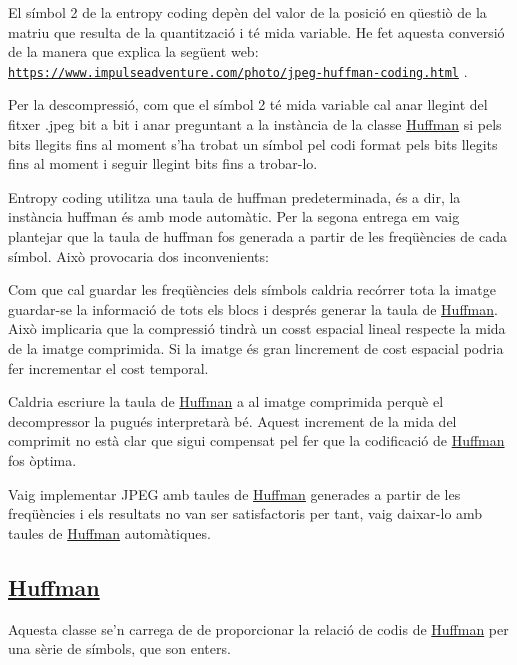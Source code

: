 El símbol 2 de la entropy coding depèn del valor de la posició en qüestiò de la matriu que resulta de la quantització i té mida variable. He fet aquesta conversió de la manera que explica la següent web\+: \href{https://www.impulseadventure.com/photo/jpeg-huffman-coding.html}{\tt https\+://www.\+impulseadventure.\+com/photo/jpeg-\/huffman-\/coding.\+html} .

Per la descompressió, com que el símbol 2 té mida variable cal anar llegint del fitxer .jpeg bit a bit i anar preguntant a la instància de la classe \hyperlink{classHuffman}{Huffman} si pels bits llegits fins al moment s’ha trobat un símbol pel codi format pels bits llegits fins al moment i seguir llegint bits fins a trobar-\/lo.

Entropy coding utilitza una taula de huffman predeterminada, és a dir, la instància huffman és amb mode automàtic. Per la segona entrega em vaig plantejar que la taula de huffman fos generada a partir de les freqüències de cada símbol. Això provocaria dos inconvenients\+:


\begin{DoxyItemize}
\item Com que cal guardar les freqüències dels símbols caldria recórrer tota la imatge guardar-\/se la informació de tots els blocs i després generar la taula de \hyperlink{classHuffman}{Huffman}. Això implicaria que la compressió tindrà un cosst espacial lineal respecte la mida de la imatge comprimida. Si la imatge és gran l\textquotesingle{}increment de cost espacial podria fer incrementar el cost temporal.
\item Caldria escriure la taula de \hyperlink{classHuffman}{Huffman} a al imatge comprimida perquè el decompressor la pugués interpretarà bé. Aquest increment de la mida del comprimit no està clar que sigui compensat pel fer que la codificació de \hyperlink{classHuffman}{Huffman} fos òptima.
\end{DoxyItemize}

Vaig implementar J\+P\+EG amb taules de \hyperlink{classHuffman}{Huffman} generades a partir de les freqüències i els resultats no van ser satisfactoris per tant, vaig daixar-\/lo amb taules de \hyperlink{classHuffman}{Huffman} automàtiques.

\subsection*{\hyperlink{classHuffman}{Huffman}}

Aquesta classe se’n carrega de de proporcionar la relació de codis de \hyperlink{classHuffman}{Huffman} per una sèrie de símbols, que son enters.


